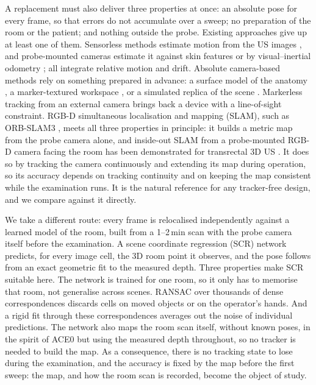 \documentclass[journal]{IEEEtran}
\begin{document}
A replacement must also deliver three properties at once: an absolute pose for every frame, so that errors do not accumulate over a sweep; no preparation of the room or the patient; and nothing outside the probe. Existing approaches give up at least one of them. Sensorless methods estimate motion from the US images \cite{prevost2018,guo2023tbme,li2024longterm,li2025tusrec}, and probe-mounted cameras estimate it against skin features \cite{sun2014skin} or by visual--inertial odometry \cite{buchanan2024vio,he2024probemounted}; all integrate relative motion and drift. Absolute camera-based methods rely on something prepared in advance: a surface model of the anatomy \cite{wang2017probesight}, a marker-textured workspace \cite{huang2025lightweight,zhang2026seeing}, or a simulated replica of the scene \cite{zhang2025servoing}. Markerless tracking from an external camera \cite{zhang2026mlrecon} brings back a device with a line-of-sight constraint. RGB-D simultaneous localisation and mapping (SLAM), such as ORB-SLAM3 \cite{campos2021orbslam3}, meets all three properties in principle: it builds a metric map from the probe camera alone, and inside-out SLAM from a probe-mounted RGB-D camera facing the room has been demonstrated for transrectal 3D US \cite{busam2018insideout}. It does so by tracking the camera continuously and extending its map during operation, so its accuracy depends on tracking continuity and on keeping the map consistent while the examination runs. It is the natural reference for any tracker-free design, and we compare against it directly.

We take a different route: every frame is relocalised independently against a learned model of the room, built from a 1--2\,min scan with the probe camera itself before the examination. A scene coordinate regression (SCR) network \cite{shotton2013,brachmann2022dsac,brachmann2023ace} predicts, for every image cell, the 3D room point it observes, and the pose follows from an exact geometric fit to the measured depth. Three properties make SCR suitable here. The network is trained for one room, so it only has to memorise that room, not generalise across scenes. RANSAC over thousands of dense correspondences discards cells on moved objects or on the operator's hands. And a rigid fit through these correspondences averages out the noise of individual predictions. The network also maps the room scan itself, without known poses, in the spirit of ACE0 \cite{brachmann2024ace0} but using the measured depth throughout, so no tracker is needed to build the map. As a consequence, there is no tracking state to lose during the examination, and the accuracy is fixed by the map before the first sweep: the map, and how the room scan is recorded, become the object of study.
\end{document}
